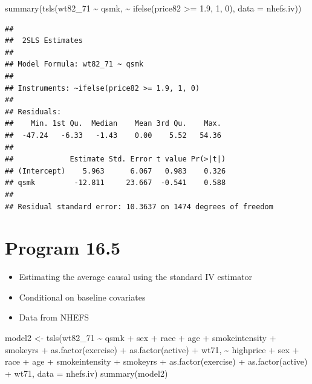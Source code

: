 \documentclass[
  10pt,
]{book}
\newenvironment{Shaded}{\begin{snugshade}}{\end{snugshade}}
\newcommand{\AttributeTok}[1]{\textcolor[rgb]{0.77,0.63,0.00}{#1}}
\newcommand{\DecValTok}[1]{\textcolor[rgb]{0.00,0.00,0.81}{#1}}
\newcommand{\FloatTok}[1]{\textcolor[rgb]{0.00,0.00,0.81}{#1}}
\newcommand{\FunctionTok}[1]{\textcolor[rgb]{0.00,0.00,0.00}{#1}}
\newcommand{\NormalTok}[1]{#1}
\newcommand{\OtherTok}[1]{\textcolor[rgb]{0.56,0.35,0.01}{#1}}
\newcommand{\SpecialCharTok}[1]{\textcolor[rgb]{0.00,0.00,0.00}{#1}}
\providecommand{\tightlist}{%
  \setlength{\itemsep}{0pt}\setlength{\parskip}{0pt}}
\begin{document}
\begin{Shaded}
\begin{Highlighting}[]
\FunctionTok{summary}\NormalTok{(}\FunctionTok{tsls}\NormalTok{(wt82\_71 }\SpecialCharTok{\textasciitilde{}}\NormalTok{ qsmk, }\SpecialCharTok{\textasciitilde{}} \FunctionTok{ifelse}\NormalTok{(price82 }\SpecialCharTok{\textgreater{}=} \FloatTok{1.9}\NormalTok{, }\DecValTok{1}\NormalTok{, }\DecValTok{0}\NormalTok{), }\AttributeTok{data =}\NormalTok{ nhefs.iv))}
\end{Highlighting}
\end{Shaded}

\begin{verbatim}
## 
##  2SLS Estimates
## 
## Model Formula: wt82_71 ~ qsmk
## 
## Instruments: ~ifelse(price82 >= 1.9, 1, 0)
## 
## Residuals:
##    Min. 1st Qu.  Median    Mean 3rd Qu.    Max. 
##  -47.24   -6.33   -1.43    0.00    5.52   54.36 
## 
##             Estimate Std. Error t value Pr(>|t|)
## (Intercept)    5.963      6.067   0.983    0.326
## qsmk         -12.811     23.667  -0.541    0.588
## 
## Residual standard error: 10.3637 on 1474 degrees of freedom
\end{verbatim}

\hypertarget{program-16.5}{%
\section{Program 16.5}\label{program-16.5}}

\begin{itemize}
\tightlist
\item
  Estimating the average causal using the standard IV estimator
\item
  Conditional on baseline covariates
\item
  Data from NHEFS
\end{itemize}

\begin{Shaded}
\begin{Highlighting}[]
\NormalTok{model2 }\OtherTok{\textless{}{-}} \FunctionTok{tsls}\NormalTok{(wt82\_71 }\SpecialCharTok{\textasciitilde{}}\NormalTok{ qsmk }\SpecialCharTok{+}\NormalTok{ sex }\SpecialCharTok{+}\NormalTok{ race }\SpecialCharTok{+}\NormalTok{ age }\SpecialCharTok{+}\NormalTok{ smokeintensity }\SpecialCharTok{+}\NormalTok{ smokeyrs }\SpecialCharTok{+} 
                      \FunctionTok{as.factor}\NormalTok{(exercise) }\SpecialCharTok{+} \FunctionTok{as.factor}\NormalTok{(active) }\SpecialCharTok{+}\NormalTok{ wt71,}
             \SpecialCharTok{\textasciitilde{}}\NormalTok{ highprice }\SpecialCharTok{+}\NormalTok{ sex }\SpecialCharTok{+}\NormalTok{ race }\SpecialCharTok{+}\NormalTok{ age }\SpecialCharTok{+}\NormalTok{ smokeintensity }\SpecialCharTok{+}\NormalTok{ smokeyrs }\SpecialCharTok{+} \FunctionTok{as.factor}\NormalTok{(exercise) }\SpecialCharTok{+}
               \FunctionTok{as.factor}\NormalTok{(active) }\SpecialCharTok{+}\NormalTok{ wt71, }\AttributeTok{data =}\NormalTok{ nhefs.iv)}
\FunctionTok{summary}\NormalTok{(model2)}
\end{Highlighting}
\end{Shaded}
\end{document}

